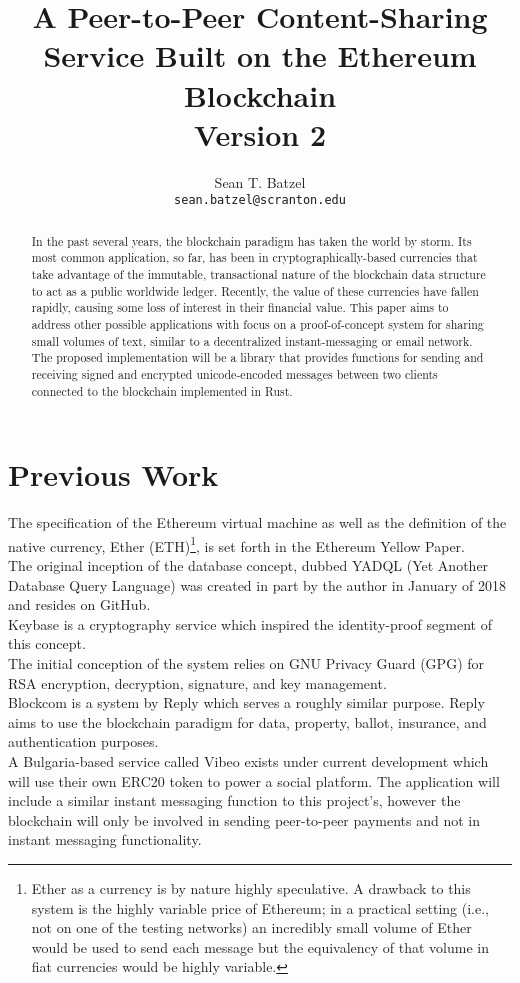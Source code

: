 \documentclass[]{article}
\title{A Peer-to-Peer Content-Sharing Service Built on the Ethereum Blockchain\\\large Version 2}
\author{Sean T. Batzel\\\texttt{sean.batzel@scranton.edu}}
\begin{document}
\maketitle
\tableofcontents

\pagebreak

\begin{abstract}
  In the past several years, the \gls{blockchain} paradigm has taken the world by storm. Its most common application, so far, has been in cryptographically-based currencies that take advantage of the immutable, transactional nature of the blockchain data structure to act as a public worldwide ledger. Recently, the value of these currencies have fallen rapidly, causing some loss of interest in their financial value. This paper aims to address other possible applications with focus on a proof-of-concept system for sharing small volumes of text, similar to a decentralized instant-messaging or email network. The proposed implementation will be a library that provides functions for sending and receiving signed and encrypted unicode-encoded messages between two clients connected to the blockchain implemented in Rust.
\end{abstract}

\section{Previous Work}
The specification of the Ethereum virtual machine as well as the definition of the native currency, Ether (ETH)\footnote{Ether as a currency is by nature highly speculative. A drawback to this system is the highly variable price of Ethereum; in a practical setting (i.e., not on one of the testing networks) an incredibly small volume of Ether would be used to send each message but the equivalency of that volume in fiat currencies would be highly variable.}, is set forth in the Ethereum Yellow Paper\cite{yellowpaper}.\\
The original inception of the database concept, dubbed YADQL (Yet Another Database Query Language) was created in part by the author in January of 2018 and resides on GitHub\cite{yadql}.\\
Keybase is a cryptography service which inspired the identity-proof segment of this concept.\cite{keybase}\\
The initial conception of the system relies on GNU Privacy Guard (GPG) for RSA encryption, decryption, signature, and key management\cite{gpg}.\\
Blockcom is a system by Reply which serves a roughly similar purpose. Reply aims to use the blockchain paradigm for data, property, ballot, insurance, and authentication purposes\cite{reply}.\\
A Bulgaria-based service called Vibeo exists under current development which will use their own ERC20 token to power a social platform. The application will include a similar instant messaging function to this project's, however the blockchain will only be involved in sending peer-to-peer payments and not in instant messaging functionality\cite{vibeo}.
\end{document}
